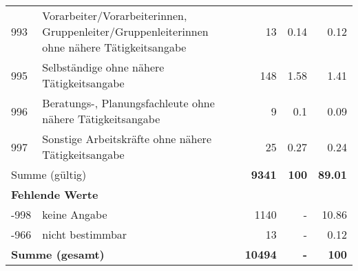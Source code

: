 \begin{longtable}{lXrrr}
        993 & \multicolumn{1}{X}{Vorarbeiter/Vorarbeiterinnen, Gruppenleiter/Gruppenleiterinnen ohne nähere Tätigkeitsangabe} & %
          \num{13} &
          \num[round-mode=places,round-precision=2]{0,14} &
          \num[round-mode=places,round-precision=2]{0,12} \\

        995 & \multicolumn{1}{X}{Selbständige ohne nähere Tätigkeitsangabe} & %
          \num{148} &
          \num[round-mode=places,round-precision=2]{1,58} &
          \num[round-mode=places,round-precision=2]{1,41} \\

        996 & \multicolumn{1}{X}{Beratungs-, Planungsfachleute ohne nähere Tätigkeitsangabe} & %
          \num{9} &
          \num[round-mode=places,round-precision=2]{0,1} &
          \num[round-mode=places,round-precision=2]{0,09} \\

        997 & \multicolumn{1}{X}{Sonstige Arbeitskräfte ohne nähere Tätigkeitsangabe} & %
          \num{25} &
          \num[round-mode=places,round-precision=2]{0,27} &
          \num[round-mode=places,round-precision=2]{0,24} \\

     \midrule
     \multicolumn{2}{l}{Summe (gültig)} &
       \textbf{\num{9341}} &
     \textbf{100} &
       \textbf{\num[round-mode=places,round-precision=2]{89,01}} \\
     \multicolumn{5}{l}{\textbf{Fehlende Werte}}\\
       -998 &
       keine Angabe &
         \num{1140} &
        - &
         \num[round-mode=places,round-precision=2]{10,86} \\
       -966 &
       nicht bestimmbar &
         \num{13} &
        - &
         \num[round-mode=places,round-precision=2]{0,12} \\
     \midrule
     \multicolumn{2}{l}{\textbf{Summe (gesamt)}} &
          \textbf{\num{10494}} &
        \textbf{-} &
        \textbf{100} \\
     \bottomrule
     \end{longtable}
     
